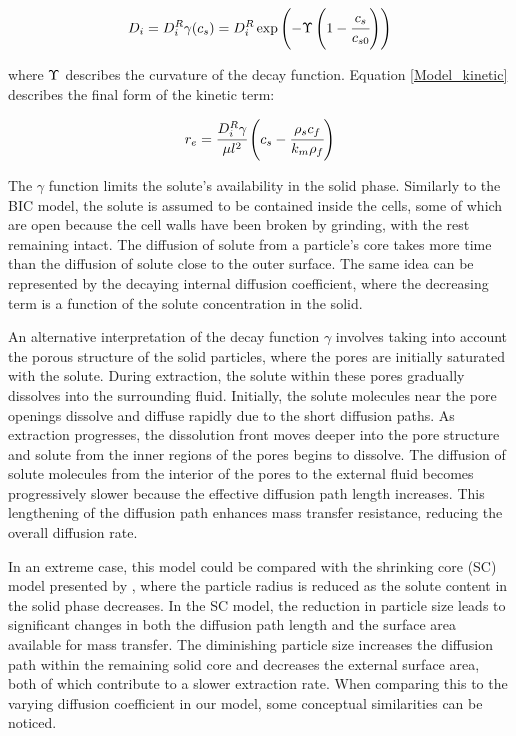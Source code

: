 \documentclass[a4paper,fleqn]{cas-dc}
\begin{document}
		{\footnotesize
			\begin{equation}
				D_i = D_i^R \gamma(c_s) = D_i^R \exp \left( - \Upsilon \left( 1-\cfrac{ c_s }{c_{s0}} \right) \right) \label{EQ: C_sat_function}
		\end{equation} }
		
		where  ${\color{black}\Upsilon}$ describes the curvature of the decay function. Equation \ref{Model_kinetic} describes the final form of the kinetic term:
		
		{\footnotesize
			\begin{equation}
				\label{Model_kinetic}
				r_e = \cfrac{D_i^R \gamma }{ \mu l^2 } \left( c_s  - \cfrac{\rho_s c_f }{ k_m \rho_f }  \right)
		\end{equation} }
		
		The $\gamma$ function limits the solute's availability in the solid phase. Similarly to the BIC model, the solute is assumed to be contained inside the cells, some of which are open because the cell walls have been broken by grinding, with the rest remaining intact. The diffusion of solute from a particle's core takes more time than the diffusion of solute close to the outer surface. The same idea can be represented by the decaying internal diffusion coefficient, where the decreasing term is a function of the solute concentration in the solid. 
		
		An alternative interpretation of the decay function $\gamma$ involves taking into account the porous structure of the solid particles, where the pores are initially saturated with the solute. During extraction, the solute within these pores gradually dissolves into the surrounding fluid. Initially, the solute molecules near the pore openings dissolve and diffuse rapidly due to the short diffusion paths. As extraction progresses, the dissolution front moves deeper into the pore structure and solute from the inner regions of the pores begins to dissolve. The diffusion of solute molecules from the interior of the pores to the external fluid becomes progressively slower because the effective diffusion path length increases. This lengthening of the diffusion path enhances mass transfer resistance, reducing the overall diffusion rate. 
		
		In an extreme case, this model could be compared with the shrinking core (SC) model presented by \citet{Goto1996}, where the particle radius is reduced as the solute content in the solid phase decreases. In the SC model, the reduction in particle size leads to significant changes in both the diffusion path length and the surface area available for mass transfer. The diminishing particle size increases the diffusion path within the remaining solid core and decreases the external surface area, both of which contribute to a slower extraction rate. When comparing this to the varying diffusion coefficient in our model, some conceptual similarities can be noticed.
		
\end{document}
